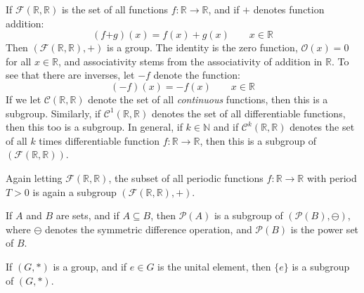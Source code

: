        \begin{example}
            If $\mathcal{F}(\mathbb{R},\mathbb{R})$ is the set of all functions
            $f:\mathbb{R}\rightarrow\mathbb{R}$, and if $\boldsymbol{+}$ denotes
            function addition:
            \begin{equation}
                (f\boldsymbol{+}g)(x)=f(x)+g(x)
                \quad\quad
                x\in\mathbb{R}
            \end{equation}
            Then $(\mathcal{F}(\mathbb{R},\mathbb{R}),\boldsymbol{+})$ is a
            group. The identity is the zero function, $\mathscr{O}(x)=0$ for all
            $x\in\mathbb{R}$, and associativity stems from the associativity of
            addition in $\mathbb{R}$. To see that there are inverses, let
            $\minus{f}$ denote the function:
            \begin{equation}
                (\minus{f})(x)=\minus{f}(x)
                \quad\quad
                x\in\mathbb{R}
            \end{equation}
            If we let $\mathcal{C}(\mathbb{R},\mathbb{R})$ denote the set of all
            \textit{continuous} functions, then this is a subgroup. Similarly,
            if $\mathcal{C}^{1}(\mathbb{R},\mathbb{R})$ denotes the set of all
            differentiable functions, then this too is a subgroup. In general,
            if $k\in\mathbb{N}$ and if $\mathcal{C}^{k}(\mathbb{R},\mathbb{R})$
            denotes the set of all $k$ times differentiable function
            $f:\mathbb{R}\rightarrow\mathbb{R}$, then this is a subgroup of
            $(\mathcal{F}(\mathbb{R},\mathbb{R}))$.
        \end{example}
        \begin{example}
            Again letting $\mathcal{F}(\mathbb{R},\mathbb{R})$, the subset of
            all periodic functions $f:\mathbb{R}\rightarrow\mathbb{R}$ with
            period $T>0$ is again a subgroup
            $(\mathcal{F}(\mathbb{R},\mathbb{R}),\boldsymbol{+})$.
        \end{example}
        \begin{example}
            If $A$ and $B$ are sets, and if $A\subseteq{B}$, then
            $\mathcal{P}(A)$ is a subgroup of $(\mathcal{P}(B),\ominus)$, where
            $\ominus$ denotes the symmetric difference operation, and
            $\mathcal{P}(B)$ is the power set of $B$.
        \end{example}
        \begin{theorem}
            If $(G,*)$ is a group, and if $e\in{G}$ is the unital element, then
            $\{e\}$ is a subgroup of $(G,*)$.
        \end{theorem}
